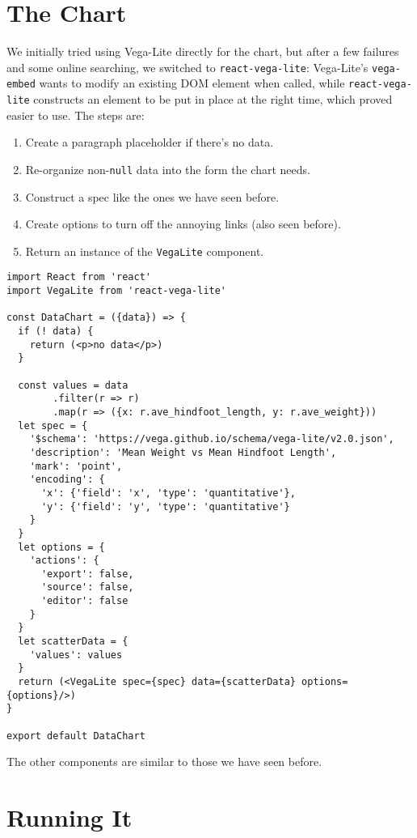 \section{The Chart}\label{s:capstone-chart}

We initially tried using Vega-Lite directly for the chart,
but after a few failures and some online searching,
we switched to \texttt{react-vega-lite}:
Vega-Lite's \texttt{vega-embed} wants to modify an existing DOM element when called,
while \texttt{react-vega-lite} constructs an element to be put in place at the right time,
which proved easier to use.
The steps are:

\begin{enumerate}
\item
  Create a paragraph placeholder if there's no data.
\item
  Re-organize non-\texttt{null} data into the form the chart needs.
\item
  Construct a spec like the ones we have seen before.
\item
  Create options to turn off the annoying links (also seen before).
\item
  Return an instance of the \texttt{VegaLite} component.
\end{enumerate}

\begin{verbatim}
import React from 'react'
import VegaLite from 'react-vega-lite'

const DataChart = ({data}) => {
  if (! data) {
    return (<p>no data</p>)
  }

  const values = data
        .filter(r => r)
        .map(r => ({x: r.ave_hindfoot_length, y: r.ave_weight}))
  let spec = {
    '$schema': 'https://vega.github.io/schema/vega-lite/v2.0.json',
    'description': 'Mean Weight vs Mean Hindfoot Length',
    'mark': 'point',
    'encoding': {
      'x': {'field': 'x', 'type': 'quantitative'},
      'y': {'field': 'y', 'type': 'quantitative'}
    }
  }
  let options = {
    'actions': {
      'export': false,
      'source': false,
      'editor': false
    }
  }
  let scatterData = {
    'values': values
  }
  return (<VegaLite spec={spec} data={scatterData} options={options}/>)
}

export default DataChart
\end{verbatim}

\noindent
The other components are similar to those we have seen before.

\section{Running It}\label{s:capstone-run}

